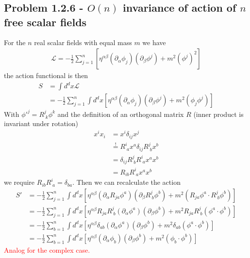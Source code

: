 \documentclass[10pt,a4paper]{book}
\theoremstyle{definition}
\begin{document}
\subsection{Problem 1.2.6 - \texorpdfstring{$O(n)$}{Lg} invariance of action of \texorpdfstring{$n$}{Lg} free scalar fields}
For the $n$ real scalar fields with equal mass $m$ we have
\begin{align}
    \mathcal{L}=-\frac{1}{2}\sum_{j=1}^n\left[\eta^{\alpha\beta}(\partial_\alpha\phi_j)(\partial_\beta\phi^j)+m^2(\phi^j)^2\right]
\end{align}
the action functional is then
\begin{align}
    S&=\int d^dx\mathcal{L}\\
    &=-\frac{1}{2}\sum_{j=1}^n\int d^dx\left[\eta^{\alpha\beta}(\partial_\alpha\phi_j)(\partial_\beta\phi^j)+m^2(\phi_j\phi^j)\right]
\end{align}
With $\phi'^{j}=R^j_{\;k}\phi^k$ and the definition of an orthogonal matrix $R$ (inner product is invariant under rotation)
\begin{align}
    x^ix_i&=x^i\delta_{ij}x^j\\
    &\stackrel{!}{=}R^i_{\;a}x^a\delta_{ij}R^j_{\;b}x^b\\
    &=\delta_{ij}R^j_{\;b}R^i_{\;a}x^ax^b\\
    &=R_{ib}R^i_{\;a}x^ax^b
\end{align}
we require $R_{ib}R^i_{\;a}=\delta_{ba}$. Then we can recalculate the action
\begin{align}
    S'&=-\frac{1}{2}\sum_{j=1}^n\int d^dx\left[\eta^{\alpha\beta}(\partial_\alpha R_{ja}\phi^a)(\partial_\beta R^j_{\;b}\phi^b)+m^2(R_{ja}\phi^a\cdot R^j_{\;b}\phi^b)\right]\\
    &=-\frac{1}{2}\sum_{j=1}^n\int d^dx\left[\eta^{\alpha\beta}R_{ja}R^j_{\;b}(\partial_\alpha \phi^a)(\partial_\beta \phi^b)+m^2R_{ja}R^j_{\;b}(\phi^a\cdot \phi^b)\right]\\
    &=-\frac{1}{2}\sum_{b=1}^n\int d^dx\left[\eta^{\alpha\beta}\delta_{ab}(\partial_\alpha \phi^a)(\partial_\beta \phi^b)+m^2\delta_{ab}(\phi^a\cdot \phi^b)\right]\\
    &=-\frac{1}{2}\sum_{b=1}^n\int d^dx\left[\eta^{\alpha\beta}(\partial_\alpha \phi_b)(\partial_\beta \phi^b)+m^2(\phi_b\cdot \phi^b)\right]   
\end{align}
\textcolor{red}{Analog for the complex case.}
\end{document}
